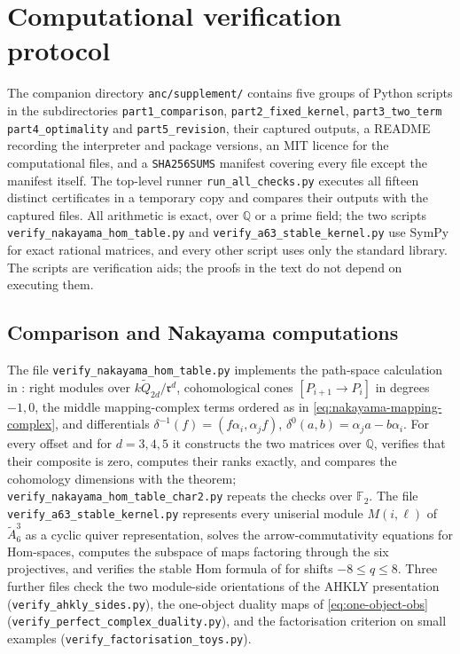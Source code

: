 \section{Computational verification protocol}\label{app:computation}

The companion directory \texttt{anc/supplement/} contains five groups of Python scripts in the subdirectories \texttt{part1\_comparison}, \texttt{part2\_fixed\_kernel}, \texttt{part3\_two\_term} \texttt{part4\_optimality} and \texttt{part5\_revision}, their captured outputs, a README recording the interpreter and package versions, an MIT licence for the computational files, and a \texttt{SHA256SUMS} manifest covering every file except the manifest itself.  The top-level runner \texttt{run\_all\_checks.py} executes all fifteen distinct certificates in a temporary copy and compares their outputs with the captured files.  All arithmetic is exact, over \(\mathbb Q\) or a prime field; the two scripts \texttt{verify\_nakayama\_hom\_table.py} and \texttt{verify\_a63\_stable\_kernel.py} use SymPy for exact rational matrices, and every other script uses only the standard library.  The scripts are verification aids; the proofs in the text do not depend on executing them.

\subsection*{Comparison and Nakayama computations}
The file \texttt{verify\_nakayama\_hom\_table.py} implements the path-space calculation in : right modules over \(k\widetilde Q_{2d}/\mathfrak r^d\), cohomological cones \([P_{i+1}\to P_i]\) in degrees \(-1,0\), the middle mapping-complex terms ordered as in \eqref{eq:nakayama-mapping-complex}, and differentials \(\delta^{-1}(f)=(f\alpha_i,\alpha_jf)\), \(\delta^0(a,b)=\alpha_ja-b\alpha_i\).  For every offset and for \(d=3,4,5\) it constructs the two matrices over \(\mathbb Q\), verifies that their composite is zero, computes their ranks exactly, and compares the cohomology dimensions with the theorem; \texttt{verify\_nakayama\_hom\_table\_char2.py} repeats the checks over \(\mathbb F_2\).  The file \texttt{verify\_a63\_stable\_kernel.py} represents every uniserial module \(M(i,\ell)\) of \(\widetilde A^3_6\) as a cyclic quiver representation, solves the arrow-commutativity equations for Hom-spaces, computes the subspace of maps factoring through the six projectives, and verifies the stable Hom formula of  for shifts \(-8\le q\le8\).  Three further files check the two module-side orientations of the AHKLY presentation (\texttt{verify\_ahkly\_sides.py}), the one-object duality maps of \eqref{eq:one-object-obs} (\texttt{verify\_perfect\_complex\_duality.py}), and the factorisation criterion on small examples (\texttt{verify\_factorisation\_toys.py}).

